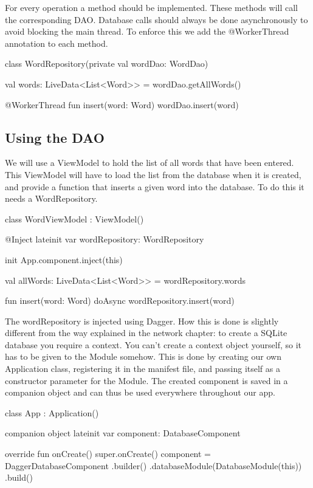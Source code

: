 For every operation a method should be implemented. 
These methods will call the corresponding DAO.
Database calls should always be done asynchronously to avoid blocking the main thread.
To enforce this we add the @WorkerThread annotation to each method.

\begin{android}
class WordRepository(private val wordDao: WordDao) {
	val words: LiveData<List<Word>> = wordDao.getAllWords()
	
	@WorkerThread
	fun insert(word: Word) {
		wordDao.insert(word)
	}
}
\end{android}


\subsection{Using the DAO}
We will use a ViewModel to hold the list of all words that have been entered.
This ViewModel will have to load the list from the database when it is created, and provide a function that inserts a given word into the database.
To do this it needs a WordRepository.

\begin{android}
class WordViewModel : ViewModel() {
	@Inject
	lateinit var wordRepository: WordRepository
	
	init {
		App.component.inject(this)
	}
	
	val allWords: LiveData<List<Word>> = wordRepository.words
	
	fun insert(word: Word) {
		doAsync {
			wordRepository.insert(word)
		}
	}
}
\end{android}

The wordRepository is injected using Dagger. 
How this is done is slightly different from the way explained in the network chapter:
to create a SQLite database you require a context. 
You can't create a context object yourself, so it has to be given to the Module somehow. 
This is done by creating our own Application class, registering it in the manifest file, and passing itself as a constructor parameter for the Module.
The created component is saved in a companion object and can thus be used everywhere throughout our app.

\begin{android}	
class App : Application() {
	companion object {
		lateinit var component: DatabaseComponent
	}
	
	override fun onCreate() {
		super.onCreate()
		component = DaggerDatabaseComponent
						.builder()
						.databaseModule(DatabaseModule(this))
						.build()
	}
}
\end{android}

